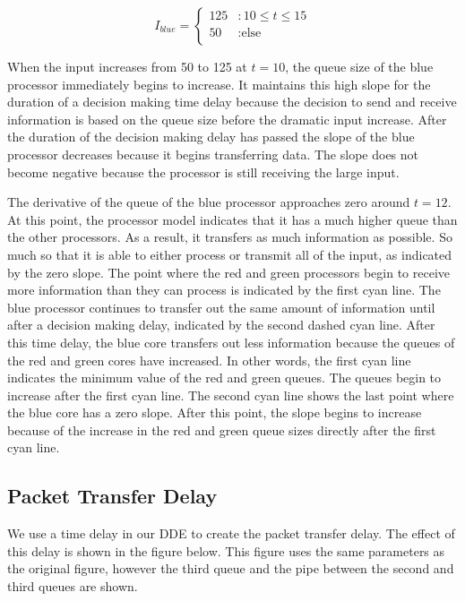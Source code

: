 \documentclass{article}
\begin{document}
\[
I_{blue} = \left\{
\begin{array}{ll}
125 & : 10 \le t \le 15 \\
50 & : \mbox{else} \\
\end{array} \right.
\]


\noindent
When the input increases from 50 to 125 at $t=10$, the queue size of the blue processor immediately begins to increase. It maintains this high slope for the duration of a decision making time delay because the decision to send and receive information is based on the queue size before the dramatic input increase. After the duration of the decision making delay has passed the slope of the blue processor decreases because it begins transferring data. The slope does not become negative because the processor is still receiving the large input. 

The derivative of the queue of the blue processor approaches zero around $t=12$. At this point, the processor model indicates that it has a much higher queue than the other processors. As a result, it transfers as much information as possible. So much so that it is able to either process or transmit all of the input, as indicated by the zero slope. The point where the red and green processors begin to receive more information than they can process is indicated by the first cyan line. The blue processor continues to transfer out the same amount of information until after a decision making delay, indicated by the second dashed cyan line. After this time delay, the blue core transfers out less information because the queues of the red and green cores have increased. In other words, the first cyan line indicates the minimum value of the red and green queues. The queues begin to increase after the first cyan line. The second cyan line shows the last point where the blue core has a zero slope. After this point, the slope begins to increase because of the increase in the red and green queue sizes directly after the first cyan line. 

\subsection{Packet Transfer Delay}

We use a time delay in our DDE to create the packet transfer delay. The effect of this delay is shown in the figure below. This figure uses the same parameters as the original figure, however the third queue and the pipe between the second and third queues are shown. 
\end{document}
